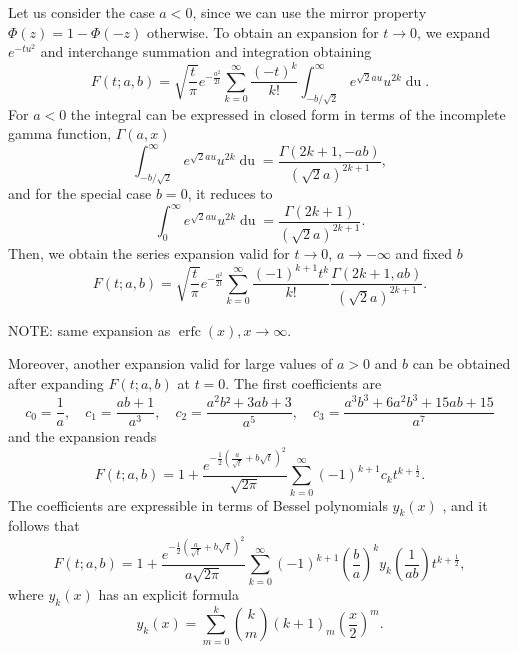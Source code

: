 \documentclass[10pt,a4paper,oneside]{article}
\DeclareMathOperator{\erfc}{erfc}
\numberwithin{equation}{section}
\begin{document}
Let us consider the case $a < 0$, since we can use the mirror property $\Phi(z) = 1 - \Phi(-z)$ otherwise. To obtain an expansion for $t \to 0$, we expand $e^{-tu^2}$ and interchange summation and integration obtaining
\begin{equation*}
F(t; a, b) = \sqrt{\frac{t}{\pi}} e^{-\frac{a^2}{2t}} \sum_{k=0}^{\infty} \frac{(-t)^k}{k!}\int_{-b/\sqrt{2}}^{\infty} e^{\sqrt{2}a u} u^{2k}\mathop{du}.
\end{equation*}
For $a < 0$ the integral can be expressed in closed form in terms of the incomplete gamma function, $\Gamma(a, x)$
\begin{equation*}
\int_{-b/\sqrt{2}}^{\infty} e^{\sqrt{2}a u} u^{2k}\mathop{du} = \frac{\Gamma(2k+1, -ab)}{(\sqrt{2}a)^{2k+1}},
\end{equation*}
and for the special case $b=0$, it reduces to
\begin{equation*}
\int_{0}^{\infty} e^{\sqrt{2}a u} u^{2k}\mathop{du} = \frac{\Gamma(2k+1)}{(\sqrt{2}a)^{2k+1}}.
\end{equation*}
Then, we obtain the series expansion valid for $t \to 0$, $a \to -\infty$ and fixed $b$
\begin{equation}\label{phi_expansion_incgamma_t_small}
F(t; a, b) = \sqrt{\frac{t}{\pi}} e^{-\frac{a^2}{2t}} \sum_{k=0}^{\infty} \frac{(-1)^{k+1} t^k}{k!}\frac{\Gamma(2k + 1, ab)}{(\sqrt{2}a)^{2k+1}}.
\end{equation}

NOTE: same expansion as $\erfc(x), x \to \infty$.

Moreover, another expansion valid for large values of $a > 0$ and $b$ can be obtained after expanding $F(t;a,b)$ at $t=0$. The first coefficients are
\begin{equation}
c_0 = \frac{1}{a}, \quad c_1 = \frac{ab + 1}{a^3}, \quad c_2 = \frac{a^2b² +3ab + 3}{a^5}, \quad c_3 = \frac{a^3b^3 + 6a^2b^3 + 15ab + 15}{a^7}
\end{equation}
and the expansion reads
\begin{equation}
F(t; a, b) = 1 + \frac{e^{-\frac{1}{2} \left(\frac{a}{\sqrt{t}} + b\sqrt{t} \right)^2}}{\sqrt{2\pi}}\sum_{k=0}^{\infty}(-1)^{k+1}c_k t^{k + \frac{1}{2}}.
\end{equation}
The coefficients are expressible in terms of Bessel polynomials $y_k(x)$ \cite[\S A001498]{OEIS}, and it follows that
\begin{equation}
F(t; a, b) = 1 + \frac{e^{-\frac{1}{2} \left(\frac{a}{\sqrt{t}} + b\sqrt{t} \right)^2}}{a\sqrt{2\pi}}\sum_{k=0}^{\infty}(-1)^{k+1} \left(\frac{b}{a}\right)^k y_k\left(\frac{1}{ab}\right) t^{k + \frac{1}{2}},
\end{equation}
where $y_k(x)$ has an explicit formula
\begin{equation}
y_k(x) = \sum_{m=0}^k \binom{k}{m} (k + 1)_m \left(\frac{x}{2}\right)^m.
\end{equation}
\end{document}
